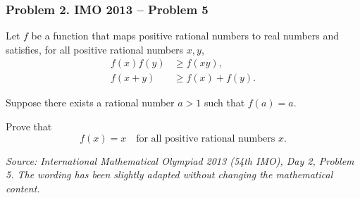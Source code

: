 \subsubsection*{Problem 2. IMO 2013 -- Problem 5}

\begin{exercisebox}[medium]

Let $f$ be a function that maps positive rational
numbers to real numbers and satisfies, for all
positive rational numbers $x,y$,
\[
\begin{aligned}
f(x)f(y)&\geq f(xy),\\
f(x+y)&\geq f(x)+f(y).
\end{aligned}
\]

Suppose there exists a rational number $a>1$
such that $f(a)=a$.

Prove that
\[
f(x)=x\quad\text{for all positive rational numbers }x.
\]

\medskip
\noindent
\textit{Source: International Mathematical Olympiad
2013 (54th IMO), Day 2, Problem 5.
The wording has been slightly adapted without
changing the mathematical content.}


\end{exercisebox}